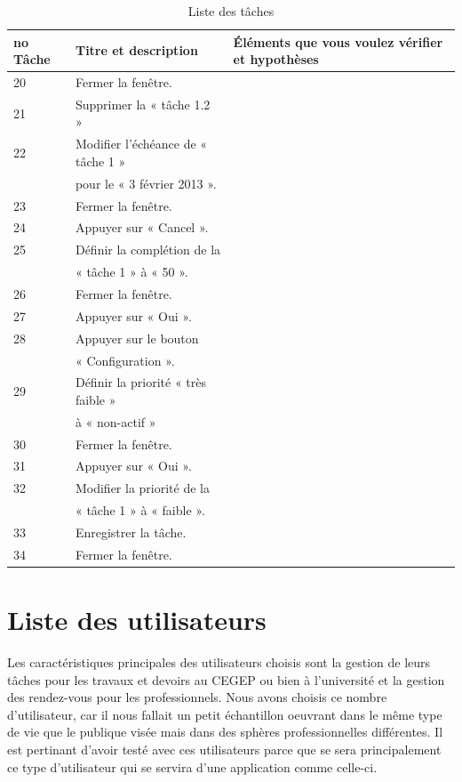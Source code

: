 \documentclass[letterpaper, oneside, 12pt, these, creativecommons]{thETS}
\begin{document}
\begin{table}
	\centering
	\begin{tabular}{|l|l|l|}
		\hline
		no Tâche	& Titre et description		& Éléments que vous voulez vérifier et hypothèses 	\\ \hline 
		20		& Fermer la fenêtre.		&								\\ \hline
		21		& Supprimer la « tâche 1.2 »	&								\\ \hline
		22		& Modifier l’échéance de « tâche 1 »&								\\
				&  pour le « 3 février 2013 ».	&								\\ \hline
		23		& Fermer la fenêtre.		&								\\ \hline
		24		& Appuyer sur « Cancel ».		&								\\ \hline
		25		& Définir la complétion de la 	&								\\
				& « tâche 1 » à « 50 ».		&								\\ \hline
		26		& Fermer la fenêtre.		&								\\ \hline
		27		& Appuyer sur « Oui ».		&								\\ \hline
		28		& Appuyer sur le bouton 		&								\\
				& « Configuration ».		&								\\ \hline
		29		& Définir la priorité « très faible » &								\\
				& à « non-actif »			&								\\ \hline
		30		& Fermer la fenêtre.		&								\\ \hline
		31		& Appuyer sur « Oui ».		&								\\ \hline
		32		& Modifier la priorité de la 		&								\\
				& « tâche 1 » à « faible ».		&								\\ \hline
		33		& Enregistrer la tâche.		&								\\ \hline
		34		& Fermer la fenêtre.		&								\\ \hline
	\end{tabular}
	\caption{Liste des tâches}
\end{table}

\section{Liste des utilisateurs}

Les caractéristiques principales des utilisateurs choisis sont la gestion de leurs tâches pour les travaux et devoirs au CEGEP ou bien à l'université et la gestion des rendez-vous pour les professionnels. Nous avons choisis ce nombre d'utilisateur, car il nous fallait un petit échantillon oeuvrant dans le même type de vie que le publique visée mais dans des sphères professionnelles différentes. Il est pertinant d'avoir testé avec ces utilisateurs parce que se sera principalement ce type d'utilisateur qui se servira d'une application comme celle-ci.
\end{document}
